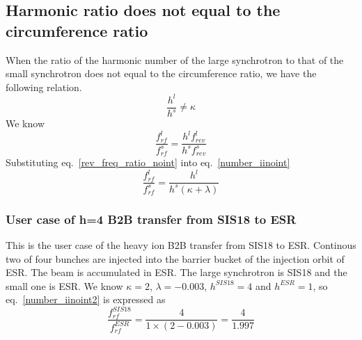 \subsection{Harmonic ratio does not equal to the circumference ratio} 
When the ratio of the harmonic number of the large synchrotron to that of the small synchrotron does not equal to the circumference ratio, we have the following relation.
\begin{equation}
\frac {h^{l}}{h^{s}}\neq \kappa  \label{harmonic_1_iinoint}
\end{equation}
We know 
\begin{equation}
\frac {f_{rf}^{l}}{f_{rf}^{s}}= \frac {h^l f_{rev}^{l}}{h^s f_{rev}^{s}}\label{number_iinoint}
\end{equation}
Substituting eq.~\ref{rev_freq_ratio_noint} into eq.~\ref{number_iinoint}
\begin{equation}
\frac {f_{rf}^{l}}{f_{rf}^{s}}= \frac {h^l}{h^s (\kappa+ \lambda)}\label{number_iinoint2}
\end{equation}
%
%

\subsubsection{User case of h=4 B2B transfer from SIS18 to ESR} 
This is the user case of the heavy ion B2B transfer from SIS18 to ESR. Continous two of four bunches are injected into the barrier bucket of the injection orbit of ESR. The beam is accumulated in ESR. The large synchrotron is SIS18 and the small one is ESR. We know $\kappa=2$, $\lambda=-0.003$, $h^{SIS18}=4$ and $h^{ESR}=1$, so eq.~\ref{number_iinoint2} is expressed as
\begin{equation}
\frac {f_{rf}^{SIS18}}{f_{rf}^{ESR}}= \frac {4}{1 \times( 2- 0.003)}=\frac{4}{1.997}
\end{equation}

